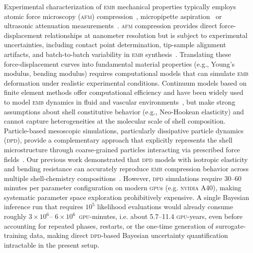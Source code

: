 \documentclass[%
 aip,
 jcp,
 amsmath,amssymb,
 preprint,%
]{revtex4-1}
\begin{document}
Experimental characterization of \textsc{emb} mechanical properties typically employs atomic force microscopy (\textsc{afm}) compression~\citep{glynos2009polymeric,glynos2009nanomechanics}, micropipette aspiration~\citep{evans1989aspiration} or ultrasonic attenuation measurements~\citep{church1995effects,coussios2008applications}. \textsc{afm} compression provides direct force-displacement relationships at nanometer resolution but is subject to experimental uncertainties, including contact point determination, tip-sample alignment artifacts, and batch-to-batch variability in \textsc{emb} synthesis~\cite{glynos2009nanomechanics,tu2009estimating}. Translating these force-displacement curves into fundamental material properties (e.g., Young's modulus, bending modulus) requires computational models that can simulate \textsc{emb} deformation under realistic experimental conditions. Continuum models based on finite element methods offer computational efficiency and have been widely used to model \textsc{emb} dynamics in fluid and vascular environments~\citep{zhang2018mechanics,guo2024ultrasound}, but make strong assumptions about shell constitutive behavior (e.g., Neo-Hookean elasticity) and cannot capture heterogeneities at the molecular scale of shell composition. Particle-based mesoscopic simulations, particularly dissipative particle dynamics (\textsc{dpd}), provide a complementary approach that explicitly represents the shell microstructure through coarse-grained particles interacting via prescribed force fields~\citep{groot1997dissipative,espanol1995statistical}. Our previous work demonstrated that \textsc{dpd} models with isotropic elasticity and bending resistance can accurately reproduce \textsc{emb} compression behavior across multiple shell-chemistry compositions~\citep{ntarakas2025dissipative}. However, \textsc{dpd} simulations require 30--60 minutes per parameter configuration on modern \textsc{gpu}s (e.g. \textsc{nvidia} A40), making systematic parameter space exploration prohibitively expensive. A single Bayesian inference run that requires $10^5$ likelihood evaluations would already consume roughly $3\times10^{6}$-- $6\times10^{6}$~\textsc{gpu}-minutes, i.e. about 5.7--11.4 \textsc{gpu}-years, even before accounting for repeated phases, restarts, or the one-time generation of surrogate-training data, making direct \textsc{dpd}-based Bayesian uncertainty quantification intractable in the present setup.
\end{document}
